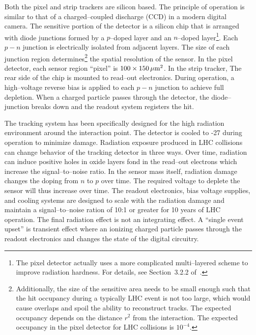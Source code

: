 Both the pixel and strip trackers are silicon based.  The principle of operation
is similar to that of a charged--coupled discharge (CCD) 
in a modern digital camera.  The sensitive portion of the detector is a silicon
chip that is arranged with diode junctions formed by a $p$--doped layer and an
$n$--doped layer\footnote{The pixel detector actually uses a more complicated
multi--layered scheme to improve radiation hardness.  For details, see
Section~3.2.2 of~\cite{CMSExperiment}.}.  Each $p-n$ junction is electrically
isolated from adjacent layers. The size of each junction region
determines\footnote{Additionally, the size of the sensitive area needs to be
small enough such that the hit occupancy during a typically LHC event is not too
large, which would cause overlaps and spoil the ability to reconstruct tracks.
The expected occupancy depends on the distance $r^2$ from the interaction.  The
expected occupancy in the pixel detector for LHC collisions is $10^{-4}$.} the
spatial resolution of the sensor.  In the pixel detector, each sensor region
``pixel'' is $100 \times 150 \,\mu\text{m}^2$.  In the strip tracker, The rear side of
the chip is mounted to read--out electronics.  During operation, a high--voltage
reverse bias is applied to each $p-n$ junction to achieve full depletion.  When
a charged particle passes through the detector, the diode--junction breaks down
and the readout system registers the hit.

The tracking system has been specifically designed for the high radiation
environment around the interaction point.  The detector is cooled to -27\celsius
during operation to minimize damage. Radiation exposure produced in LHC
collisions can change behavior of the tracking detector in three ways.  Over
time, radiation can induce positive holes in oxide layers fond in the read--out
electrons which increase the signal--to--noise ratio.  In the sensor mass
itself, radiation damage changes the doping from $n$ to $p$ over time.  The
required voltage to deplete the sensor will thus increase over time.  The
readout electronics, bias voltage supplies, and cooling systems are designed to
scale with the radiation damage and maintain a signal--to--noise ration of 10:1
or greater for 10 years of LHC operation.  The final radiation effect is not an
integrating effect.  A ``single event upset'' is transient effect where an
ionizing charged particle passes through the readout electronics and changes the
state of the digital circuitry.  

